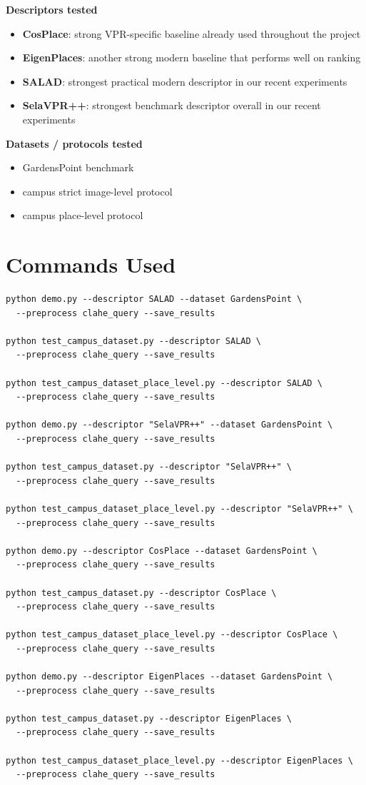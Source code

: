 \documentclass[11pt]{article}
\begin{document}
\textbf{Descriptors tested}
\begin{itemize}[leftmargin=*]
  \item \textbf{CosPlace}: strong VPR-specific baseline already used throughout the project
  \item \textbf{EigenPlaces}: another strong modern baseline that performs well on ranking
  \item \textbf{SALAD}: strongest practical modern descriptor in our recent experiments
  \item \textbf{SelaVPR++}: strongest benchmark descriptor overall in our recent experiments
\end{itemize}

\textbf{Datasets / protocols tested}
\begin{itemize}[leftmargin=*]
  \item GardensPoint benchmark
  \item campus strict image-level protocol
  \item campus place-level protocol
\end{itemize}

\section*{Commands Used}
\begin{verbatim}
python demo.py --descriptor SALAD --dataset GardensPoint \
  --preprocess clahe_query --save_results

python test_campus_dataset.py --descriptor SALAD \
  --preprocess clahe_query --save_results

python test_campus_dataset_place_level.py --descriptor SALAD \
  --preprocess clahe_query --save_results

python demo.py --descriptor "SelaVPR++" --dataset GardensPoint \
  --preprocess clahe_query --save_results

python test_campus_dataset.py --descriptor "SelaVPR++" \
  --preprocess clahe_query --save_results

python test_campus_dataset_place_level.py --descriptor "SelaVPR++" \
  --preprocess clahe_query --save_results

python demo.py --descriptor CosPlace --dataset GardensPoint \
  --preprocess clahe_query --save_results

python test_campus_dataset.py --descriptor CosPlace \
  --preprocess clahe_query --save_results

python test_campus_dataset_place_level.py --descriptor CosPlace \
  --preprocess clahe_query --save_results

python demo.py --descriptor EigenPlaces --dataset GardensPoint \
  --preprocess clahe_query --save_results

python test_campus_dataset.py --descriptor EigenPlaces \
  --preprocess clahe_query --save_results

python test_campus_dataset_place_level.py --descriptor EigenPlaces \
  --preprocess clahe_query --save_results
\end{verbatim}
\end{document}
